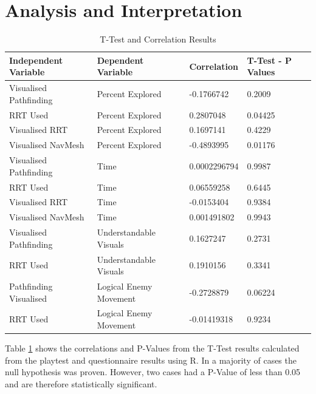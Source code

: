 \documentclass[journal]{IEEEtran}
\begin{document}
	\section{Analysis and Interpretation}
	\begin{table}[]
		\centering
		\caption{T-Test and Correlation Results}
		\label{StatsTable}
		\def\arraystretch{1.5}
		\begin{tabular}{|l|l|l|l|}
			\hline
			\textbf{Independent Variable }    &  \textbf{Dependent Variable } & \textbf{Correlation} & \textbf{T-Test - P Values}                   \\ \hline
			Visualised Pathfinding & Percent Explored       & -0.1766742   & 0.2009            \\ \hline
			RRT Used               & Percent Explored         & 0.2807048    & 0.04425           \\ \hline
			Visualised RRT         & Percent Explored       & 0.1697141    & 0.4229            \\ \hline
			Visualised NavMesh     & Percent Explored       & -0.4893995   & 0.01176           \\ \hline
			Visualised Pathfinding & Time                    & 0.0002296794 & 0.9987            \\ \hline
			RRT Used               & Time                    & 0.06559258   & 0.6445            \\ \hline
			Visualised RRT         & Time                   & -0.0153404   & 0.9384            \\ \hline
			Visualised NavMesh     & Time                   & 0.001491802  & 0.9943            \\ \hline
			Visualised Pathfinding & Understandable Visuals & 0.1627247    & 0.2731            \\ \hline
			RRT Used               & Understandable Visuals & 0.1910156    & 0.3341            \\ \hline
			Pathfinding Visualised & Logical Enemy Movement & -0.2728879   & 0.06224           \\ \hline
			RRT Used               & Logical Enemy Movement & -0.01419318  & 0.9234            \\ \hline
		\end{tabular}
	\end{table}
	
	
	Table \ref{StatsTable} shows the correlations and P-Values from the T-Test results calculated from the playtest and questionnaire results using R. In a majority of cases the null hypothesis was proven. However, two cases had a P-Value of less than 0.05 and are therefore statistically significant. 
	
\end{document}
